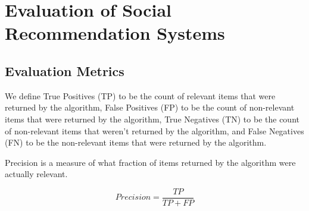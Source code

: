 
\chapter{Evaluation of Social Recommendation Systems}

\section{Evaluation Metrics}

We define True Positives (TP) to be the count of relevant items that were returned by the algorithm, False Positives (FP) to be the count of non-relevant items that were returned by the algorithm, True Negatives (TN) to be the count of non-relevant items that weren't returned by the algorithm, and False Negatives (FN) to be the non-relevant items that were returned by the algorithm.

Precision is a measure of what fraction of items returned by the algorithm were actually relevant.

\[
Precision = \frac {TP} {TP + FP}
\]

